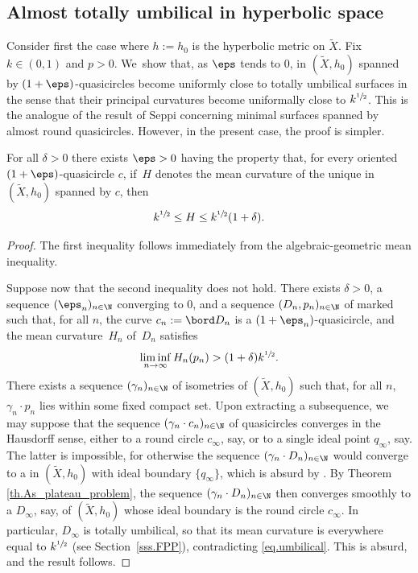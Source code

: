\subsection{Almost totally umbilical \kdisks in hyperbolic space}\label{ss.totally_umb} Consider first the case where $h:=h_0$ is the hyperbolic metric on $\tilde{X}$. Fix $k\in(0,1)$ and $p>0$. We~show that, as $\eps$ tends to $0$, \kdisks in $(\tilde{X},h_0)$ spanned by $(1+\eps)$-quasicircles become uniformly close to totally umbilical surfaces in the sense that their principal curvatures become uniformally close to $k^{\sfrac{1}{2}}$. This is the \ksurface analogue of the result \cite{Seppi} of Seppi concerning minimal surfaces spanned by almost round quasicircles. However, in the present case, the proof is simpler.

\begin{lemma}\label{l.almost_tot_umbilical}
For all $\delta>0$ there exists $\eps>0$ having the property that, for every oriented $(1+\eps)$-quasicircle $c$, if~$H$ denotes the mean curvature of the unique \kdisk in $(\tilde{X},h_0)$ spanned by $c$, then
\begin{equation*}
k^{\sfrac{1}{2}}\leq H\leq k^{\sfrac{1}{2}}(1+\delta).
\end{equation*}
\end{lemma}

\begin{proof}
The first inequality follows immediately from the algebraic-geometric mean inequality.

Suppose now that the second inequality does not hold. There exists $\delta>0$, a sequence $(\eps_n)_{n\in\N}$ converging to $0$, and a sequence $(D_n,p_n)_{n\in\N}$ of marked \kdisks such that, for all $n$, the curve $c_n:=\bord D_n$ is a $(1+\eps_n)$-quasicircle, and the mean curvature~$H_n$ of~$D_n$ satisfies
\begin{equation}\label{eq.umbilical}
\liminf_{n\to\infty} H_n(p_n)>(1+\delta)k^{\sfrac{1}{2}}.
\end{equation}
There exists a sequence $(\gamma_n)_{n\in\N}$ of isometries of $(\tilde{X},h_0)$ such that, for all $n$, $\gamma_n\cdot p_n$ lies within some fixed compact set. Upon extracting a subsequence, we may suppose that the sequence $(\gamma_n\cdot c_n)_{n\in\N}$ of quasicircles converges in the Hausdorff sense, either to a round circle $c_\infty$, say, or to a single ideal point $q_\infty$, say. The latter is impossible, for otherwise the sequence $(\gamma_n\cdot D_n)_{n\in\N}$ would converge to a \ksurface in $(\tilde{X},h_0)$ with ideal boundary $\{q_\infty\}$, which is absurd by \cite[Prop.\,2.5.3]{LabourieInvent}. By Theorem \ref{th.As_plateau_problem}, the sequence $(\gamma_n\cdot D_n)_{n\in\N}$ then converges smoothly to a \kdisk $D_\infty$, say, of $(\tilde{X},h_0)$ whose ideal boundary is the round circle $c_\infty$. In particular, $D_\infty$ is totally umbilical, so that its mean curvature is everywhere equal to $k^{\sfrac{1}{2}}$ (see Section~\ref{sss.FPP}), contradicting \eqref{eq.umbilical}. This is absurd, and the result follows.
\end{proof}


